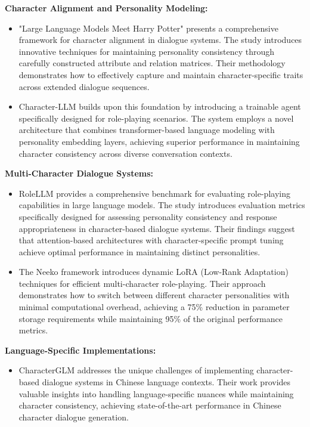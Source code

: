 \documentclass{article}
\begin{document}
\textbf{Character Alignment and Personality Modeling:}
\begin{itemize}
\item "Large Language Models Meet Harry Potter" \cite{chen2023} presents a comprehensive framework for character alignment in dialogue systems. The study introduces innovative techniques for maintaining personality consistency through carefully constructed attribute and relation matrices. Their methodology demonstrates how to effectively capture and maintain character-specific traits across extended dialogue sequences.
\item Character-LLM \cite{shao2023} builds upon this foundation by introducing a trainable agent specifically designed for role-playing scenarios. The system employs a novel architecture that combines transformer-based language modeling with personality embedding layers, achieving superior performance in maintaining character consistency across diverse conversation contexts.
\end{itemize}

\textbf{Multi-Character Dialogue Systems:}
\begin{itemize}
\item RoleLLM \cite{wang2023} provides a comprehensive benchmark for evaluating role-playing capabilities in large language models. The study introduces evaluation metrics specifically designed for assessing personality consistency and response appropriateness in character-based dialogue systems. Their findings suggest that attention-based architectures with character-specific prompt tuning achieve optimal performance in maintaining distinct personalities.
\item The Neeko framework \cite{yu2024} introduces dynamic LoRA (Low-Rank Adaptation) techniques for efficient multi-character role-playing. Their approach demonstrates how to switch between different character personalities with minimal computational overhead, achieving a 75\% reduction in parameter storage requirements while maintaining 95\% of the original performance metrics.
\end{itemize}

\textbf{Language-Specific Implementations:}
\begin{itemize}
\item CharacterGLM \cite{zhou2023} addresses the unique challenges of implementing character-based dialogue systems in Chinese language contexts. Their work provides valuable insights into handling language-specific nuances while maintaining character consistency, achieving state-of-the-art performance in Chinese character dialogue generation.
\end{itemize}
\end{document}
